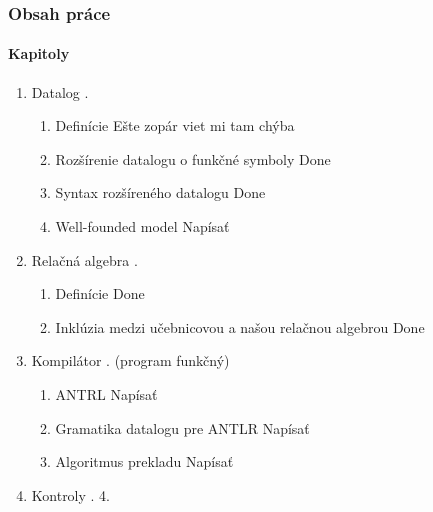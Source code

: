 \documentclass[11pt]{beamer}
\begin{document}
\begin{frame}
\frametitle{Obsah práce}
\framesubtitle{Kapitoly}

\begin{enumerate}
    \item Datalog .
    \begin{enumerate} 
        \item Definície \quad Ešte zopár viet mi tam chýba
        \item Rozšírenie datalogu o funkčné symboly \quad Done
        \item Syntax rozšíreného datalogu \quad Done
        \item Well-founded model \quad Napísať
    \end{enumerate}
    \item Relačná algebra . 
    \begin{enumerate}
        \item Definície \quad Done
        \item Inklúzia medzi učebnicovou a našou relačnou algebrou \quad Done
    \end{enumerate}
    \item Kompilátor . (program funkčný)
    \begin{enumerate}
        \item ANTRL \quad Napísať
        \item Gramatika datalogu pre ANTLR \quad Napísať
        \item Algoritmus prekladu \quad Napísať
    \end{enumerate}
    \item Kontroly . 4.
\end{enumerate}
\end{frame}
\end{document}
